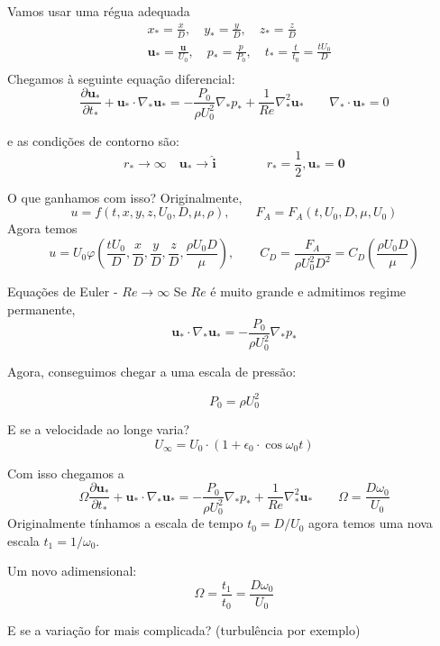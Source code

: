 \documentclass{beamer}
\newcommand{\pr}[1]{\ensuremath{ \mathbf{#1}}}    %
\newcommand{\lra}{\ensuremath{\longrightarrow}}
\newcommand{\p}[1]{\ensuremath{ \mathbf{#1}}}    %
\newcommand{\qqrq}{\ensuremath{\qquad\lra\qquad}}
\newcommand{\pd}{\ensuremath{\partial}}
\begin{document}
\begin{frame}{Vamos usar uma régua adequada}
\[
\begin{aligned}
&x_* = \frac{x}{D}, \quad y_* = \frac{y}{D}, \quad z_* = \frac{z}{D}\\
&\p{u}_* = \frac{\p{u}}{U_0}, \quad p_* = \frac{p}{P_0}, \quad t_* = \frac{t}{t_0} = \frac{tU_0}{D} \\
\end{aligned}
\]
Chegamos à seguinte equação diferencial:
\[
\frac{\pd\p{u}_*}{\pd t_*} + \p{u}_*\cdot\nabla_*\p{u_*} = -\frac{P_0}{\rho U_0^2}\nabla_* p_* + \frac{1}{Re}\nabla_*^2\p{u}_* \qquad \nabla_*\cdot\p{u}_* = 0
\]

e as condições de contorno são:
\[
 r_*\lra\infty \quad \p{u}_*\lra \p{\hat{i}} \qquad\qquad r_*=\frac{1}{2}, \p{u}_* = \p{0}
\]

\end{frame}

\begin{frame}{O que ganhamos com isso?}
  Originalmente,
  \[
u = f(t, x, y, z, U_0, D, \mu, \rho), \qquad F_A =  F_A(t,U_0, D, \mu, U_0)
\]
Agora temos
\[
u = U_0 \varphi\left(\frac{t U_0}{D}, \frac{x}{D}, \frac{y}{D}, \frac{z}{D}, \frac{\rho U_0 D}{\mu}\right), \qquad C_D = \frac{F_A}{\rho U_0^2 D^2} = C_D\left( \frac{\rho U_0 D}{\mu}\right)
\]



\end{frame}


\begin{frame}{Equações de Euler - $Re\lra\infty$}
  Se $Re$ é muito grande e admitimos regime permanente,
  \[
  \p{u}_*\cdot\nabla_*\p{u_*} = -\frac{P_0}{\rho U_0^2}\nabla_* p_* %
  \]

  Agora, conseguimos chegar a uma escala de pressão:

  \[
P_0 = \rho U_0^2
\]
\end{frame}

\begin{frame}{E se a velocidade ao longe varia?}
  \[
U_\infty = U_0\cdot\left(1 + \epsilon_0\cdot\cos \omega_0 t\right)
\]

Com isso chegamos a
\[
\Omega\frac{\pd\p{u}_*}{\pd t_*} + \p{u}_*\cdot\nabla_*\p{u_*} = -\frac{P_0}{\rho U_0^2}\nabla_* p_* + \frac{1}{Re}\nabla_*^2\p{u}_*  \qquad \Omega = \frac{D\omega_0}{U_0}
\]
Originalmente tínhamos a escala de tempo $t_0 = D/U_0$ agora temos uma nova escala $t_1 = 1/\omega_0$.

Um novo adimensional:
\[
\Omega = \frac{t_1}{t_0} = \frac{D\omega_0}{U_0}
\]

E se a variação for mais complicada? (turbulência por exemplo)
\end{frame}
\end{document}

